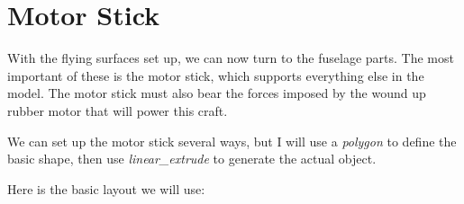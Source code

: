 \section*{Motor Stick}

With the flying surfaces set up, we can now turn to the fuselage parts. The
most important of these is the motor stick, which supports everything else in
the model. The motor stick must also bear the forces imposed by the wound up
rubber motor that will power this craft.

We can set up the motor stick several ways, but I will use a {\it polygon} to
define the basic shape, then use {\it linear\_extrude} to generate the actual
object.

Here is the basic layout we will use:


